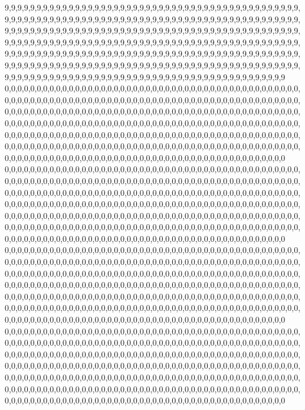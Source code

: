 9,9,9,9,9,9,9,9,9,9,9,9,9,9,9,9,9,9,9,9,9,9,9,9,9,9,9,9,9,9,9,9,9,9,9,9,9,9,9,9,9,9,9,9,9,9,9,9,9,9,9,9,9,9,9,9,9,9,9,9,9,9,9,9,9,9,9,9,9,9,9,9,9,9,9,9,9,9,9,9,9,9,9,9,9,9,9,9,9,9,9,9,9,9,9,9,9,9,9,9,9,9,9,9,9,9,9,9,9,9,9,9,9,9,9,9,9,9,9,9,9,9,9,9,9,9,9,9,9,9,9,9,9,9,9,9,9,9,9,9,9,9,9,9,9,9,9,9,9,9,9,9,9,9,9,9,9,9,9,9,9,9,9,9,9,9,9,9,9,9,9,9,9,9,9,9,9,9,9,9,9,9,9,9,9,9,9,9,9,9,9,9,9,9,9,9,9,9,9,9,9,9,9,9,9,9,9,9,9,9,9,9,9,9,9,9,9,9,9,9,9,9,9,9,9,9,9,9,9,9,9,9,9,9,9,9,9,9,9,9,9,9,9,9,9,9,9,9,9,9,9,9,9,9,9,9,9,9,9,9,9,9,9,9,9,9,9,9,9,9,9,9,9,9,9,9,9,9,9,9,9,9,9,9,9,9,9,9,9,9,9,9,9,9,9,9,9,9,9,9,9,9,9,9,9,9,9,9,9,9,9,9,9,9,9,9,9,9,9,9
0,0,0,0,0,0,0,0,0,0,0,0,0,0,0,0,0,0,0,0,0,0,0,0,0,0,0,0,0,0,0,0,0,0,0,0,0,0,0,0,0,0,0,0,0,0,0,0,0,0,0,0,0,0,0,0,0,0,0,0,0,0,0,0,0,0,0,0,0,0,0,0,0,0,0,0,0,0,0,0,0,0,0,0,0,0,0,0,0,0,0,0,0,0,0,0,0,0,0,0,0,0,0,0,0,0,0,0,0,0,0,0,0,0,0,0,0,0,0,0,0,0,0,0,0,0,0,0,0,0,0,0,0,0,0,0,0,0,0,0,0,0,0,0,0,0,0,0,0,0,0,0,0,0,0,0,0,0,0,0,0,0,0,0,0,0,0,0,0,0,0,0,0,0,0,0,0,0,0,0,0,0,0,0,0,0,0,0,0,0,0,0,0,0,0,0,0,0,0,0,0,0,0,0,0,0,0,0,0,0,0,0,0,0,0,0,0,0,0,0,0,0,0,0,0,0,0,0,0,0,0,0,0,0,0,0,0,0,0,0,0,0,0,0,0,0,0,0,0,0,0,0,0,0,0,0,0,0,0,0,0,0,0,0,0,0,0,0,0,0,0,0,0,0,0,0,0,0,0,0,0,0,0,0,0,0,0,0,0,0,0,0,0,0,0,0,0,0,0,0,0,0,0,0,0,0,0,0,0,0,0,0,0,0,0,0,0,0,0,0
0,0,0,0,0,0,0,0,0,0,0,0,0,0,0,0,0,0,0,0,0,0,0,0,0,0,0,0,0,0,0,0,0,0,0,0,0,0,0,0,0,0,0,0,0,0,0,0,0,0,0,0,0,0,0,0,0,0,0,0,0,0,0,0,0,0,0,0,0,0,0,0,0,0,0,0,0,0,0,0,0,0,0,0,0,0,0,0,0,0,0,0,0,0,0,0,0,0,0,0,0,0,0,0,0,0,0,0,0,0,0,0,0,0,0,0,0,0,0,0,0,0,0,0,0,0,0,0,0,0,0,0,0,0,0,0,0,0,0,0,0,0,0,0,0,0,0,0,0,0,0,0,0,0,0,0,0,0,0,0,0,0,0,0,0,0,0,0,0,0,0,0,0,0,0,0,0,0,0,0,0,0,0,0,0,0,0,0,0,0,0,0,0,0,0,0,0,0,0,0,0,0,0,0,0,0,0,0,0,0,0,0,0,0,0,0,0,0,0,0,0,0,0,0,0,0,0,0,0,0,0,0,0,0,0,0,0,0,0,0,0,0,0,0,0,0,0,0,0,0,0,0,0,0,0,0,0,0,0,0,0,0,0,0,0,0,0,0,0,0,0,0,0,0,0,0,0,0,0,0,0,0,0,0,0,0,0,0,0,0,0,0,0,0,0,0,0,0,0,0,0,0,0,0,0,0,0,0,0,0,0,0,0,0,0,0,0,0,0,0
0,0,0,0,0,0,0,0,0,0,0,0,0,0,0,0,0,0,0,0,0,0,0,0,0,0,0,0,0,0,0,0,0,0,0,0,0,0,0,0,0,0,0,0,0,0,0,0,0,0,0,0,0,0,0,0,0,0,0,0,0,0,0,0,0,0,0,0,0,0,0,0,0,0,0,0,0,0,0,0,0,0,0,0,0,0,0,0,0,0,0,0,0,0,0,0,0,0,0,0,0,0,0,0,0,0,0,0,0,0,0,0,0,0,0,0,0,0,0,0,0,0,0,0,0,0,0,0,0,0,0,0,0,0,0,0,0,0,0,0,0,0,0,0,0,0,0,0,0,0,0,0,0,0,0,0,0,0,0,0,0,0,0,0,0,0,0,0,0,0,0,0,0,0,0,0,0,0,0,0,0,0,0,0,0,0,0,0,0,0,0,0,0,0,0,0,0,0,0,0,0,0,0,0,0,0,0,0,0,0,0,0,0,0,0,0,0,0,0,0,0,0,0,0,0,0,0,0,0,0,0,0,0,0,0,0,0,0,0,0,0,0,0,0,0,0,0,0,0,0,0,0,0,0,0,0,0,0,0,0,0,0,0,0,0,0,0,0,0,0,0,0,0,0,0,0,0,0,0,0,0,0,0,0,0,0,0,0,0,0,0,0,0,0,0,0,0,0,0,0,0,0,0,0,0,0,0,0,0,0,0,0,0,0,0,0,0,0,0,0
0,0,0,0,0,0,0,0,0,0,0,0,0,0,0,0,0,0,0,0,0,0,0,0,0,0,0,0,0,0,0,0,0,0,0,0,0,0,0,0,0,0,0,0,0,0,0,0,0,0,0,0,0,0,0,0,0,0,0,0,0,0,0,0,0,0,0,0,0,0,0,0,0,0,0,0,0,0,0,0,0,0,0,0,0,0,0,0,0,0,0,0,0,0,0,0,0,0,0,0,0,0,0,0,0,0,0,0,0,0,0,0,0,0,0,0,0,0,0,0,0,0,0,0,0,0,0,0,0,0,0,0,0,0,0,0,0,0,0,0,0,0,0,0,0,0,0,0,0,0,0,0,0,0,0,0,0,0,0,0,0,0,0,0,0,0,0,0,0,0,0,0,0,0,0,0,0,0,0,0,0,0,0,0,0,0,0,0,0,0,0,0,0,0,0,0,0,0,0,0,0,0,0,0,0,0,0,0,0,0,0,0,0,0,0,0,0,0,0,0,0,0,0,0,0,0,0,0,0,0,0,0,0,0,0,0,0,0,0,0,0,0,0,0,0,0,0,0,0,0,0,0,0,0,0,0,0,0,0,0,0,0,0,0,0,0,0,0,0,0,0,0,0,0,0,0,0,0,0,0,0,0,0,0,0,0,0,0,0,0,0,0,0,0,0,0,0,0,0,0,0,0,0,0,0,0,0,0,0,0,0,0,0,0,0,0,0,0,0,0
